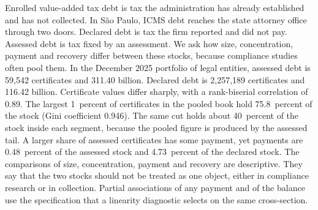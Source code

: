 Enrolled value-added tax debt is tax the administration has already established and has not collected.
In S\~ao Paulo, ICMS debt reaches the state attorney office through two doors.
Declared debt is tax the firm reported and did not pay.
Assessed debt is tax fixed by an assessment.
We ask how size, concentration, payment and recovery differ between these stocks, because compliance studies often pool them.
In the December 2025 portfolio of legal entities, assessed debt is 59,542 certificates and \brl{}311.40 billion.
Declared debt is 2,257,189 certificates and \brl{}116.42 billion.
Certificate values differ sharply, with a rank-biserial correlation of 0.89.
The largest 1~percent of certificates in the pooled book hold 75.8~percent of the stock (Gini coefficient 0.946).
The same cut holds about 40~percent of the stock inside each segment, because the pooled figure is produced by the assessed tail.
A larger share of assessed certificates has some payment, yet payments are 0.48~percent of the assessed stock and 4.73~percent of the declared stock.
The comparisons of size, concentration, payment and recovery are descriptive.
They say that the two stocks should not be treated as one object, either in compliance research or in collection.
Partial associations of any payment and of the balance use the specification that a linearity diagnostic selects on the same cross-section.
